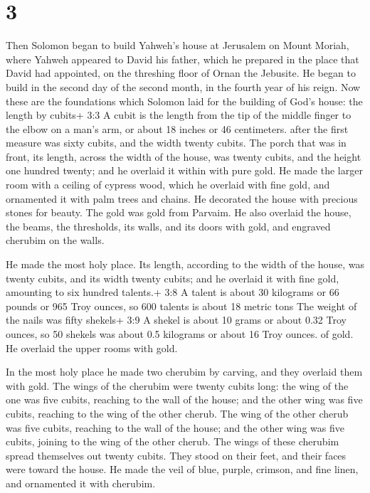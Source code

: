 \hypertarget{section-2}{%
\section{3}\label{section-2}}

 Then Solomon began to build Yahweh's house at Jerusalem on
Mount Moriah, where Yahweh appeared to David his father, which he
prepared in the place that David had appointed, on the threshing floor
of Ornan the Jebusite.  He began to build in the second day
of the second month, in the fourth year of his reign.  Now
these are the foundations which Solomon laid for the building of God's
house: the length by cubits+ 3:3 A cubit is the length from the tip of
the middle finger to the elbow on a man's arm, or about 18 inches or 46
centimeters. after the first measure was sixty cubits, and the width
twenty cubits.  The porch that was in front, its length,
across the width of the house, was twenty cubits, and the height one
hundred twenty; and he overlaid it within with pure gold. 
He made the larger room with a ceiling of cypress wood, which he
overlaid with fine gold, and ornamented it with palm trees and chains.
 He decorated the house with precious stones for beauty. The
gold was gold from Parvaim.  He also overlaid the house, the
beams, the thresholds, its walls, and its doors with gold, and engraved
cherubim on the walls.

 He made the most holy place. Its length, according to the
width of the house, was twenty cubits, and its width twenty cubits; and
he overlaid it with fine gold, amounting to six hundred talents.+ 3:8 A
talent is about 30 kilograms or 66 pounds or 965 Troy ounces, so 600
talents is about 18 metric tons  The weight of the nails was
fifty shekels+ 3:9 A shekel is about 10 grams or about 0.32 Troy ounces,
so 50 shekels was about 0.5 kilograms or about 16 Troy ounces. of gold.
He overlaid the upper rooms with gold.

 In the most holy place he made two cherubim by carving,
and they overlaid them with gold.  The wings of the
cherubim were twenty cubits long: the wing of the one was five cubits,
reaching to the wall of the house; and the other wing was five cubits,
reaching to the wing of the other cherub.  The wing of the
other cherub was five cubits, reaching to the wall of the house; and the
other wing was five cubits, joining to the wing of the other cherub.
 The wings of these cherubim spread themselves out twenty
cubits. They stood on their feet, and their faces were toward the house.
 He made the veil of blue, purple, crimson, and fine linen,
and ornamented it with cherubim.

